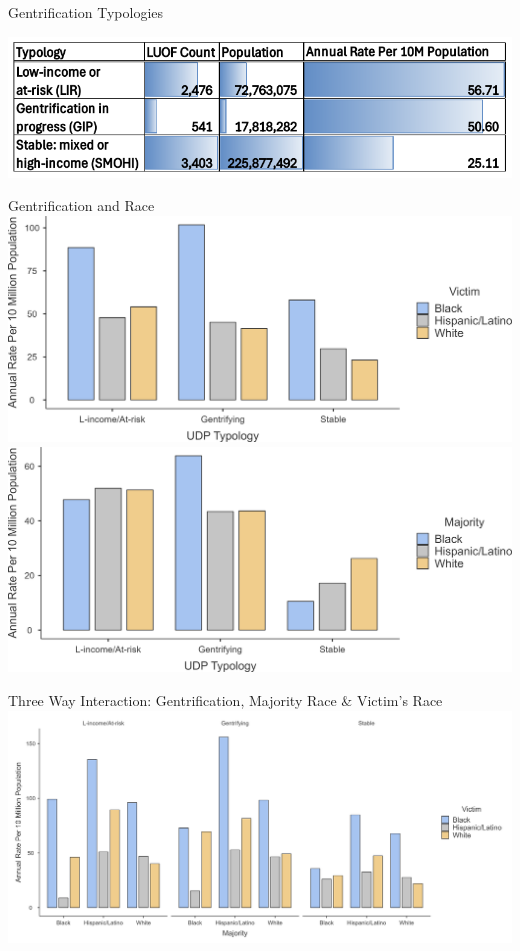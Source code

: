 \documentclass{beamer}
\begin{document}
\begin{frame}{Gentrification Typologies}
\begin{center}
\includegraphics[width=0.75\linewidth]{images/udp_typology_only}
\end{center}
\end{frame}

\begin{frame}{Gentrification and Race}
	\includegraphics[width=0.49\linewidth]{images/udp_victim_race}
	\hfill
	\includegraphics[width=0.49\linewidth]{images/udp_majority}
\end{frame}

\begin{frame}{Three Way Interaction: Gentrification, Majority Race \& Victim’s Race}
	\includegraphics[width=\linewidth]{images/udp_race_majority_victim_legend}
\end{frame}

\end{document}
